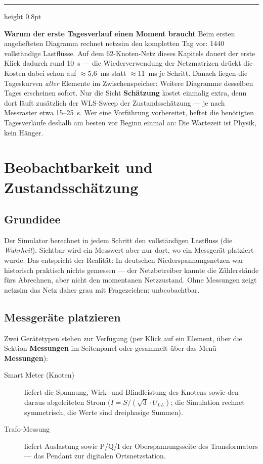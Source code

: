 \documentclass[11pt,a4paper,parskip=half]{scrreprt}
\newcommand{\ui}[1]{\textsf{\bfseries #1}}          %
\newenvironment{beispiel}[1][Beispiel]
  {\par\medskip
   {\color{bsp}\hrule height 0.8pt}\nopagebreak\smallskip
   \noindent\textbf{\textsf{\textcolor{bsp}{#1}}}\quad\ignorespaces}
  {\par\nopagebreak\smallskip{\color{bsp}\hrule height 0.8pt}\par\medskip}
\begin{document}
\begin{beispiel}[Warum der erste Tagesverlauf einen Moment braucht]
Beim ersten angehefteten Diagramm rechnet netzsim den kompletten Tag
vor: 1440 vollständige Lastflüsse. Auf dem 62-Knoten-Netz dieses
Kapitels dauert der erste Klick dadurch rund 10~s --- die
Wiederverwendung der Netzmatrizen drückt die Kosten dabei schon auf
$\approx$5{,}6~ms statt $\approx$11~ms je Schritt. Danach liegen die
Tageskurven \emph{aller} Elemente im Zwischenspeicher: Weitere
Diagramme desselben Tages erscheinen sofort. Nur die Sicht
\ui{Schätzung} kostet einmalig extra, denn dort läuft zusätzlich der
WLS-Sweep der Zustandsschätzung --- je nach Messraster etwa
15--25~s. Wer eine Vorführung vorbereitet, heftet die benötigten
Tagesverläufe deshalb am besten vor Beginn einmal an: Die Wartezeit
ist Physik, kein Hänger.
\end{beispiel}

\chapter{Beobachtbarkeit und Zustandsschätzung}
\label{ch:observability}

\section{Grundidee}

Der Simulator berechnet in jedem Schritt den vollständigen Lastfluss
(die \emph{Wahrheit}). Sichtbar wird ein Messwert aber nur dort, wo
ein Messgerät platziert wurde. Das entspricht der Realität: In
deutschen Niederspannungsnetzen war historisch praktisch nichts
gemessen --- der Netzbetreiber kannte die Zählerstände fürs
Abrechnen, aber nicht den momentanen Netzzustand. Ohne Messungen
zeigt netzsim das Netz daher grau mit Fragezeichen: unbeobachtbar.

\section{Messgeräte platzieren}

Zwei Gerätetypen stehen zur Verfügung (per Klick auf ein Element,
über die Sektion \ui{Messungen} im Seitenpanel oder gesammelt über
das Menü \ui{Messungen}):

\begin{description}
  \item[Smart Meter (Knoten)] liefert die Spannung, Wirk- und
    Blindleistung des Knotens sowie den daraus abgeleiteten Strom
    ($I = S / (\sqrt{3} \cdot U_{LL})$; die Simulation rechnet
    symmetrisch, die Werte sind dreiphasige Summen).
  \item[Trafo-Messung] liefert Auslastung sowie P/Q/I der
    Oberspannungsseite des Transformators --- das Pendant zur
    digitalen Ortsnetzstation.
\end{description}
\end{document}
